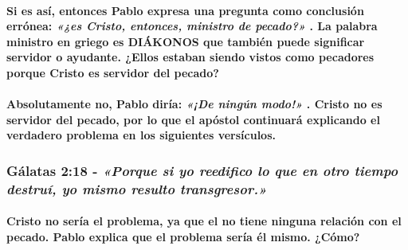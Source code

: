 \documentclass[11a pt,twoside]{article}
\newcommand{\scripture}[1]{%
  {\fontsize{12pt}{16pt}\selectfont\ScriptureFont\itshape #1}%
}
\let\oldsubsubsection\subsubsection
\renewcommand{\subsubsection}{\needspace{4\baselineskip}\oldsubsubsection}
\let\oldparagraph\paragraph
\renewcommand{\paragraph}{\needspace{3\baselineskip}\oldparagraph}
\begin{document}
\paragraph{\texorpdfstring{Si es así, entonces Pablo expresa una
pregunta como conclusión errónea:
\scripture{«¿es Cristo, entonces, ministro de pecado?»}. La palabra
ministro en griego es DIÁKONOS que también puede significar servidor o
ayudante. ¿Ellos estaban siendo vistos como pecadores porque Cristo es
servidor del
pecado?}{Si es así, entonces Pablo expresa una pregunta como conclusión errónea: . La palabra ministro en griego es DIÁKONOS que también puede significar servidor o ayudante. ¿Ellos estaban siendo vistos como pecadores porque Cristo es servidor del pecado?}}\label{si-es-asuxed-entonces-pablo-expresa-una-pregunta-como-conclusiuxf3n-erruxf3nea-es-cristo-entonces-ministro-de-pecado.-la-palabra-ministro-en-griego-es-diuxe1konos-que-tambiuxe9n-puede-significar-servidor-o-ayudante.-ellos-estaban-siendo-vistos-como-pecadores-porque-cristo-es-servidor-del-pecado}

\paragraph{\texorpdfstring{Absolutamente no, Pablo diría:
\scripture{«¡De ningún modo!»}. Cristo no es servidor del pecado, por lo
que el apóstol continuará explicando el verdadero problema en los
siguientes
versículos.}{Absolutamente no, Pablo diría: . Cristo no es servidor del pecado, por lo que el apóstol continuará explicando el verdadero problema en los siguientes versículos.}}\label{absolutamente-no-pablo-diruxeda-de-ninguxfan-modo.-cristo-no-es-servidor-del-pecado-por-lo-que-el-apuxf3stol-continuaruxe1-explicando-el-verdadero-problema-en-los-siguientes-versuxedculos.}

\subsubsection{\texorpdfstring{Gálatas 2:18 -
\scripture{«Porque si yo reedifico lo que en otro tiempo destruí, yo mismo resulto transgresor.»}}{Gálatas 2:18 - }}\label{guxe1latas-218---porque-si-yo-reedifico-lo-que-en-otro-tiempo-destruuxed-yo-mismo-resulto-transgresor.}

\paragraph{Cristo no sería el problema, ya que el no tiene ninguna
relación con el pecado. Pablo explica que el problema sería él mismo.
¿Cómo?}\label{cristo-no-seruxeda-el-problema-ya-que-el-no-tiene-ninguna-relaciuxf3n-con-el-pecado.-pablo-explica-que-el-problema-seruxeda-uxe9l-mismo.-cuxf3mo}
\end{document}
